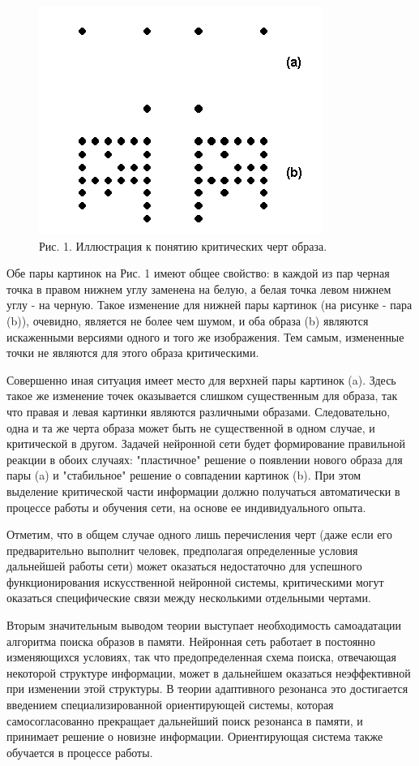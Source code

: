 \documentclass[12pt,a4paper,article]{article}
\begin{document}
\begin{figure}[h!]
	\centering
	\includegraphics[scale = 1.10]{images/1.png}
	\caption{Рис. 1. Иллюстрация к понятию критических черт образа.}
	\label{image:1}
\end{figure}	



Обе пары картинок на Рис. 1 имеют общее свойство: в каждой из пар черная точка в правом нижнем углу заменена на белую, а белая точка левом нижнем углу - на черную. Такое изменение для нижней пары картинок (на рисунке - пара (b)), очевидно, является не более чем шумом, и оба образа (b) являются искаженными версиями одного и того же изображения. Тем самым, измененные точки не являются для этого образа критическими.

Совершенно иная ситуация имеет место для верхней пары картинок (a). Здесь такое же изменение точек оказывается слишком существенным для образа, так что правая и левая картинки являются различными образами. Следовательно, одна и та же черта образа может быть не существенной в одном случае, и критической в другом. Задачей нейронной сети будет формирование правильной реакции в обоих случаях: "пластичное" решение о появлении нового образа для пары (a) и "стабильное" решение о совпадении картинок (b). При этом выделение критической части информации должно получаться автоматически в процессе работы и обучения сети, на основе ее индивидуального опыта.

Отметим, что в общем случае одного лишь перечисления черт (даже если его предварительно выполнит человек, предполагая определенные условия дальнейшей работы сети) может оказаться недостаточно для успешного функционирования искусственной нейронной системы, критическими могут оказаться специфические связи между несколькими отдельными чертами.

Вторым значительным выводом теории выступает необходимость самоадатации алгоритма поиска образов в памяти. Нейронная сеть работает в постоянно изменяющихся условиях, так что предопределенная схема поиска, отвечающая некоторой структуре информации, может в дальнейшем оказаться неэффективной при изменении этой структуры. В теории адаптивного резонанса это достигается введением специализированной ориентирующей системы, которая самосогласованно прекращает дальнейший поиск резонанса в памяти, и принимает решение о новизне информации. Ориентирующая система также обучается в процессе работы.
\end{document}
